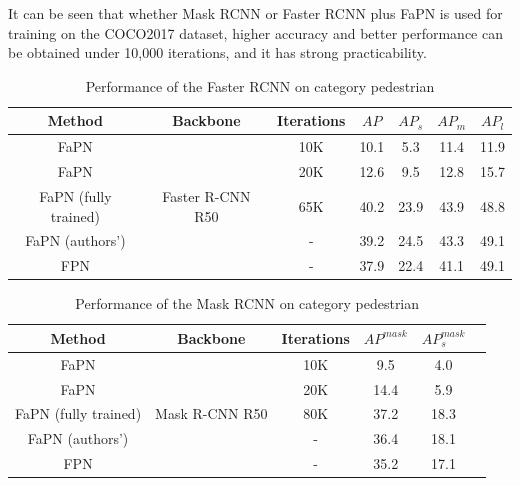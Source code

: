 

It can be seen that whether Mask RCNN \cite{he2017mask} or Faster RCNN plus FaPN is used for training on the COCO2017 dataset, higher accuracy and better performance can be obtained under 10,000 iterations, and it has strong practicability.


\begin{table}[htb]
    \begin{center}
        \caption{Performance of the Faster RCNN on category pedestrian}\label{table1}
        \begin{tabular}{|c|c|c|c|c|c|c|} %
            \toprule
            \textbf{Method} & \textbf{Backbone}&\textbf{Iterations} & $AP$ & $AP_s$ & $AP_m$ & $AP_l$ \\
            \hline
            FaPN          & \multirow{5}{*}{Faster R-CNN R50}&10K &10.1&5.3&11.4&11.9 \\
            FaPN          &  &20K&12.6&9.5&12.8&15.7 \\
			FaPN (fully trained)         & &65K &40.2&23.9&43.9&48.8 \\
			FaPN (authors')         &  &-&39.2&24.5&43.3&49.1 \\
			FPN  & &- &37.9&22.4&41.1&49.1 \\
            \bottomrule
        \end{tabular}
    \end{center}
\end{table}

\begin{table}[htb]
		\begin{center}
			\caption{Performance of the Mask RCNN on category pedestrian}\label{table2}
			\begin{tabular}{|c|c|c|c|c|c} %
				\toprule
				\textbf{Method} & \textbf{Backbone}&\textbf{Iterations} & $AP^{mask}$ & $AP^{mask}_s$ \\
				\hline
				FaPN & \multirow{5}{*}{Mask R-CNN R50}&10K&9.5&4.0 \\
				FaPN & &20K&14.4&5.9 \\
				FaPN (fully trained) & &80K &37.2&18.3 \\
				FaPN (authors') & &- &36.4&18.1 \\
				FPN & &- &35.2&17.1 \\
				\bottomrule
			\end{tabular}
		\end{center}
	\end{table}


